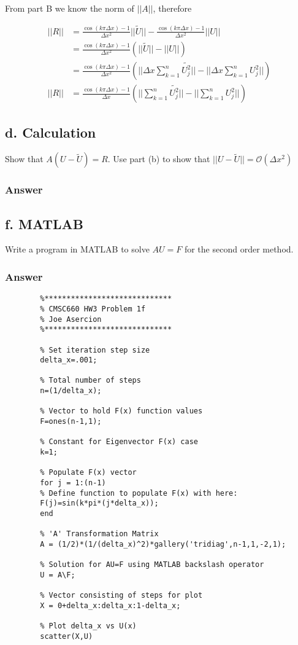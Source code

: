 \documentclass{article}
\begin{document}
		From part B we know the norm of $||A||$, therefore
		
		\begin{align*}
			||R||&=\frac{\cos(k\pi\Delta x)-1}{\Delta x^{2}}||\tilde{U}||-\frac{\cos(k\pi\Delta x)-1}{\Delta x^{2}}||U||\\
			&=\frac{\cos(k\pi\Delta x)-1}{\Delta x^{2}}(||\tilde{U}||-||U||)\\
			&=\frac{\cos(k\pi\Delta x)-1}{\Delta x^{2}}(||\Delta x\sum_{k=1}^{n}\tilde{U_{j}^{2}}||-||\Delta x\sum_{k=1}^{n}U_{j}^{2}||)\\
			||R||&=\frac{\cos(k\pi\Delta x)-1}{\Delta x}(||\sum_{k=1}^{n}\tilde{U_{j}^{2}}||-||\sum_{k=1}^{n}U_{j}^{2}||)
		\end{align*}
		
		
	\subsection{d. Calculation}
		Show that $A(U-\tilde{U})=R$.  Use part (b) to show that $||U-\tilde{U}||=\mathcal{O}(\Delta x^{2})$
	
		\subsubsection{Answer}
	\newpage
	\subsection{f. MATLAB}
		Write a program in MATLAB to solve $AU=F$ for the second order method.
		\subsubsection{Answer}
		\begin{lstlisting}
		%*****************************
		% CMSC660 HW3 Problem 1f
		% Joe Asercion
		%***************************** 
		
		% Set iteration step size
		delta_x=.001;
		
		% Total number of steps
		n=(1/delta_x);
		
		% Vector to hold F(x) function values
		F=ones(n-1,1);
		
		% Constant for Eigenvector F(x) case
		k=1;
		
		% Populate F(x) vector
		for j = 1:(n-1)
		% Define function to populate F(x) with here:
		F(j)=sin(k*pi*(j*delta_x));
		end
		
		% 'A' Transformation Matrix
		A = (1/2)*(1/(delta_x)^2)*gallery('tridiag',n-1,1,-2,1);
		
		% Solution for AU=F using MATLAB backslash operator
		U = A\F;
		
		% Vector consisting of steps for plot
		X = 0+delta_x:delta_x:1-delta_x;
		
		% Plot delta_x vs U(x)
		scatter(X,U)
		\end{lstlisting}
		\newpage
\end{document}
